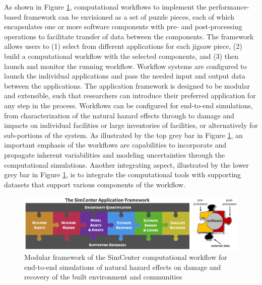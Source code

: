 As shown in Figure \ref{fig:intro_SimCenter_framework}, computational workflows to implement the performance-based framework can be envisioned as a set of puzzle pieces, each of which encapsulates one or more software components with pre- and post-processing operations to facilitate transfer of data between the components.  The framework allows users to (1) select from different applications for each jigsaw piece, (2) build a computational workflow with the selected components, and (3) then launch and monitor the running workflow. Workflow systems are configured to launch the individual applications and pass the needed input and output data between the applications.  The application framework is designed to be modular and extensible, such that researchers can introduce their preferred application for any step in the process.  Workflows can be configured for end-to-end simulations, from characterization of the natural hazard effects through to damage and impacts on individual facilities or large inventories of facilities, or alternatively for sub-portions of the system.  As illustrated by the top grey bar in Figure \ref{fig:intro_SimCenter_framework}, an important emphasis of the workflows are capabilities to incorporate and propagate inherent variabilities and modeling uncertainties through the computational simulations. Another integrating aspect, illustrated by the lower grey bar in Figure \ref{fig:intro_SimCenter_framework}, is to integrate the computational tools with supporting datasets that support various components of the workflow. 

\begin{figure}[htb]
    \centering
    \includegraphics[width=1.0\textwidth, angle = 0]{Figures/SimCenter_framework.png}
    \caption{Modular framework of the SimCenter computational workflow for end-to-end simulations of natural hazard effects on damage and recovery of the built environment and communities}
    \label{fig:intro_SimCenter_framework}
\end{figure}

